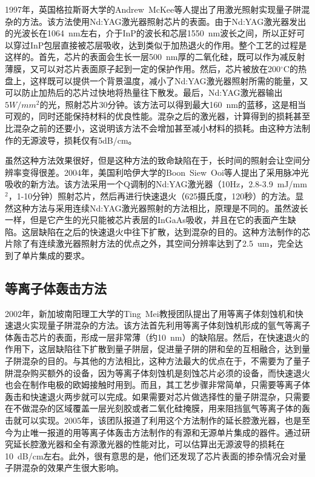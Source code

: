 \documentclass{ZJUthesis}
\begin{document}
1997年，英国格拉斯哥大学的Andrew~McKee等人提出了用激光照射实现量子阱混杂的方法\cite{mckee1997monolithic}。该方法使用Nd:YAG激光器照射芯片的表面。由于Nd:YAG激光器发出的光波长在1064~nm左右，介于InP的波长和芯层1550~nm波长之间，所以正好可以穿过InP包层直接被芯层吸收，达到类似于加热退火的作用。整个工艺的过程是这样的。首先，芯片的表面会生长一层500~nm厚的二氧化硅，既可以作为减反射薄膜，又可以对芯片表面原子起到一定的保护作用。然后，芯片被放在200$^{\circ}$C的热盘上，这样既可以提供一个背景温度，减小了Nd:YAG激光器照射所需的能量，又可以防止加热后的芯片过快地将热量往下散发。最后，Nd:YAG激光器输出$5W/mm^2$的光，照射芯片30分钟。该方法可以得到最大160~nm的蓝移，这是相当可观的，同时还能保持材料的优良性能。混杂之后的激光器，计算得到的损耗甚至比混杂之前的还要小，这说明该方法不会增加甚至减小材料的损耗。由这种方法制作的无源波导，损耗仅有5dB/cm。

虽然这种方法效果很好，但是这种方法的致命缺陷在于，长时间的照射会让空间分辨率变得很差。2004年，美国利哈伊大学的Boon~Siew~Ooi等人提出了采用脉冲光吸收的新方法\cite{ooi2004multiple}。该方法采用一个Q调制的Nd:YAG激光器（10Hz，2.8-3.9~mJ/mm$^2$，1-10分钟）照射芯片，然后再进行快速退火（625摄氏度，120秒）的方法。显然这种方法与采用连续Nd:YAG激光器照射的方法相比，原理是不同的。虽然波长一样，但是它产生的光只能被芯片表层的InGaAs吸收，并且在它的表面产生缺陷。这层缺陷在之后的快速退火中往下扩散，达到混杂的目的。这种方法制作的芯片除了有连续激光器照射方法的优点之外，其空间分辨率达到了2.5~um，完全达到了单片集成的要求。

\subsection{等离子体轰击方法}

2002年，新加坡南阳理工大学的Ting~Mei教授团队提出了用等离子体刻蚀机和快速退火实现量子阱混杂的方法\cite{Djie2002High}。该方法首先利用等离子体刻蚀机形成的氩气等离子体轰击芯片的表面，形成一层非常薄（约10~nm）的缺陷层。然后，在快速退火的作用下，这层缺陷往下扩散到量子阱层，促进量子阱的阱和垒的互相融合，达到量子阱混杂的目的。与其他的方法相比，这种方法最大的优点在于，不需要为了量子阱混杂购买额外的设备，因为等离子体刻蚀机是刻蚀芯片必须的设备，而快速退火也会在制作电极的欧姆接触时用到。而且，其工艺步骤非常简单，只需要等离子体轰击和快速退火两步就可以完成。如果需要对芯片做选择性的量子阱混杂，只需要在不做混杂的区域覆盖一层光刻胶或者二氧化硅掩膜，用来阻挡氩气等离子体的轰击就可以实现。2005年，该团队报道了利用这个方法制作的延长腔激光器\cite{Djie2005Plasma}，也是至今为止唯一报道的用等离子体轰击方法制作的有源和无源单片集成的器件。通过研究延长腔激光器和全有源激光器的性能对比，可以估算出无源波导的损耗在10~dB/cm左右。此外，很有意思的是，他们还发现了芯片表面的掺杂情况会对量子阱混杂的效果产生很大影响\cite{Xu2009Inductively}。
\end{document}
